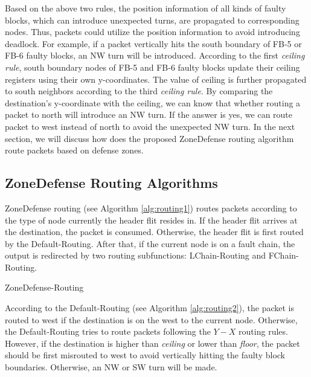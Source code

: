 Based on the above two rules, the position information of all kinds of faulty blocks, which can introduce unexpected turns, are propagated to corresponding nodes. Thus, packets could utilize the position information to avoid introducing deadlock. For example, if a packet vertically hits the south boundary of FB-5 or FB-6 faulty blocks, an NW turn will be introduced. According to the first \textit{ceiling rule}, south boundary nodes of FB-5 and FB-6 faulty blocks update their ceiling registers using their own y-coordinates. The value of ceiling is further propagated to south neighbors according to the third \textit{ceiling rule}. By comparing the destination’s y-coordinate with the ceiling, we can know that whether routing a packet to north will introduce an NW turn. If the answer is yes, we can route packet to west instead of north to avoid the unexpected NW turn. In the next section, we will discuss how does the proposed ZoneDefense routing algorithm route packets based on defense zones.

\subsection{ZoneDefense Routing Algorithms}
ZoneDefense routing (see Algorithm \ref{alg:routing1}) routes packets according to the type of node currently the header flit resides in. If the header flit arrives at the destination, the packet is consumed. Otherwise, the header flit is first routed by the Default-Routing. After that, if the current node is on a fault chain, the output is redirected by two routing subfunctions: LChain-Routing and FChain-Routing.

\begin{algorithm}
    \caption{ZoneDefense-Routing}
    \label{alg:routing1}
\end{algorithm}

According to the Default-Routing (see Algorithm \ref{alg:routing2}), the packet is routed to west if the destination is on the west to the current node. Otherwise, the Default-Routing tries to route packets following the $Y-X$ routing rules. However, if the destination is higher than \textit{ceiling} or lower than \textit{floor}, the packet should be first misrouted to west to avoid vertically hitting the faulty block boundaries. Otherwise, an NW or SW turn will be made.

